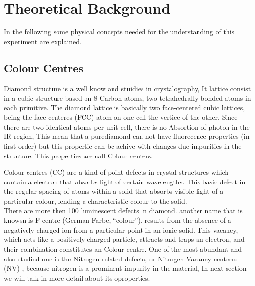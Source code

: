 \section{Theoretical Background}
In the following some physical concepts needed for the understanding of this experiment are explained.
\subsection{Colour Centres}




Diamond structure is a well know and stuidies in crystalography, It lattice consist in a cubic structure based on 8 Carbon atoms, two tetrahedrally bonded atoms in each primitive. The diamond lattice is basically two face-centered cubic lattices, being the face centeres (FCC) atom on one cell the vertice of the other. Since there are two  identical atoms per unit cell, there is no Absortion of photon in the IR-region, This mean that a purediamond can not have fluorecence properties (in first order) but this propertie can be achive with changes due impurities in the structure. This properties are call Colour centers.

Colour centres (CC) are a kind of point defects in crystal structures which contain a electron that absorbs light of certain wavelengths. This basic defect in the regular spacing of atoms within a solid that absorbs visible light of a particular colour, lending a characteristic colour to the solid. \\

There are more then 100 luminescent defects in diamond. another name that is knowsn is F-centre (German Farbe, “colour”), results from the absence of a negatively charged ion from a particular point in an ionic solid. This vacancy, which acts like a positively charged particle, attracts and traps an electron, and their combination constitutes an Colour-centre.  One of the most abundant and also  studied one is the  Nitrogen related defects, or Nitrogen-Vacancy centeres (NV) , because  nitrogen is a prominent impurity in the material, In next section we will talk in more detail about its oproperties.



